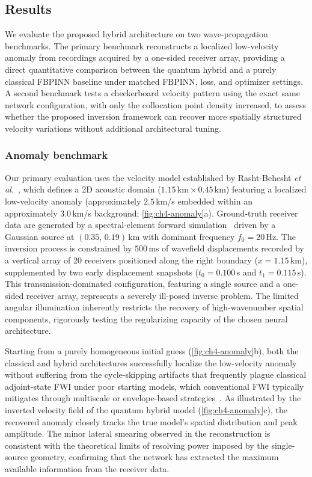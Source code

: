 \subsection{Results}\label{sec:ch4-results}

We evaluate the proposed hybrid architecture on two wave-propagation benchmarks. The primary benchmark reconstructs a localized low-velocity anomaly from recordings acquired by a one-sided receiver array, providing a direct quantitative comparison between the quantum hybrid and a purely classical FBPINN baseline under matched FBPINN, loss, and optimizer settings. A second benchmark tests a checkerboard velocity pattern using the exact same network configuration, with only the collocation point density increased, to assess whether the proposed inversion framework can recover more spatially structured velocity variations without additional architectural tuning.

\subsubsection{Anomaly benchmark}
\label{sec:ch4-results-anomaly}

Our primary evaluation uses the velocity model established by Rasht-Behesht \emph{et al.}~\cite{rahst}, which defines a 2D acoustic domain ($1.15$\,km\,$\times$\,$0.45$\,km) featuring a localized low-velocity anomaly (approximately $2.5$\,km/s embedded within an approximately $3.0$\,km/s background; \ref{fig:ch4-anomaly}a). Ground-truth receiver data are generated by a spectral-element forward simulation~\cite{komatitsch1998spectral} driven by a Gaussian source at $(0.35,\,0.19)$\,km with dominant frequency $f_0 = 20$\,Hz. The inversion process is constrained by $500$\,ms of wavefield displacements recorded by a vertical array of 20 receivers positioned along the right boundary ($x = 1.15$\,km), supplemented by two early displacement snapshots ($t_0 = 0.100$\,s and $t_1 = 0.115$\,s). This transmission-dominated configuration, featuring a single source and a one-sided receiver array, represents a severely ill-posed inverse problem. The limited angular illumination inherently restricts the recovery of high-wavenumber spatial components, rigorously testing the regularizing capacity of the chosen neural architecture.

Starting from a purely homogeneous initial guess (\ref{fig:ch4-anomaly}b), both the classical and hybrid architectures successfully localize the low-velocity anomaly without suffering from the cycle-skipping artifacts that frequently plague classical adjoint-state FWI under poor starting models, which conventional FWI typically mitigates through multiscale or envelope-based strategies~\cite{11458622}. As illustrated by the inverted velocity field of the quantum hybrid model (\ref{fig:ch4-anomaly}c), the recovered anomaly closely tracks the true model's spatial distribution and peak amplitude. The minor lateral smearing observed in the reconstruction is consistent with the theoretical limits of resolving power imposed by the single-source geometry, confirming that the network has extracted the maximum available information from the receiver data.

